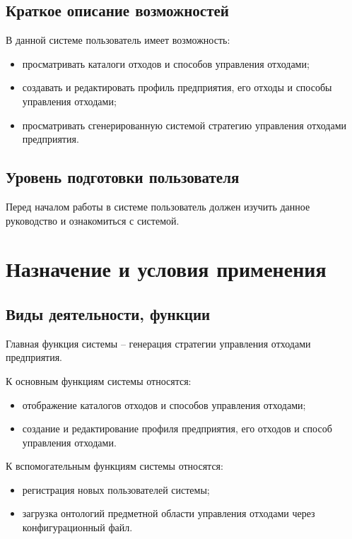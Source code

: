 \documentclass[a4paper]{G2-105}
\begin{document}
\section{Краткое описание возможностей}

В данной системе пользователь имеет возможность:
\begin{itemize}
\item просматривать каталоги отходов и способов управления отходами;
\item создавать и редактировать профиль предприятия, его отходы и способы управления отходами;
\item просматривать сгенерированную системой стратегию управления отходами предприятия.
\end{itemize}

\section{Уровень подготовки пользователя}

Перед началом работы в системе пользователь должен изучить данное руководство и ознакомиться с системой.

\chapter{Назначение и условия применения}

\ttl

\section{Виды деятельности, функции}

Главная функция системы -- генерация стратегии управления отходами предприятия.

К основным функциям системы относятся:
\begin{itemize}
\item отображение каталогов отходов и способов управления отходами;
\item создание и редактирование профиля предприятия, его отходов и способ управления отходами.
\end{itemize}

К вспомогательным функциям системы относятся:
\begin{itemize}
\item регистрация новых пользователей системы;
\item загрузка онтологий предметной области управления отходами через конфигурационный файл.
\end{itemize}
\end{document}
